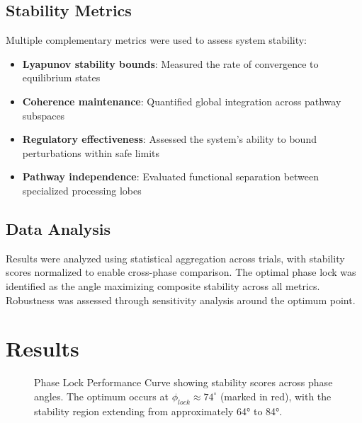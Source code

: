 \documentclass[12pt,a4paper]{report}
\begin{document}
\subsection{Stability Metrics}

Multiple complementary metrics were used to assess system stability:

\begin{itemize}
\item \textbf{Lyapunov stability bounds}: Measured the rate of convergence to equilibrium states
\item \textbf{Coherence maintenance}: Quantified global integration across pathway subspaces  
\item \textbf{Regulatory effectiveness}: Assessed the system's ability to bound perturbations within safe limits
\item \textbf{Pathway independence}: Evaluated functional separation between specialized processing lobes
\end{itemize}

\subsection{Data Analysis}

Results were analyzed using statistical aggregation across trials, with stability scores normalized to enable cross-phase comparison. The optimal phase lock was identified as the angle maximizing composite stability across all metrics. Robustness was assessed through sensitivity analysis around the optimum point.

\section{Results}

\begin{figure}[H]
\centering
{}
\caption{Phase Lock Performance Curve showing stability scores across phase angles. The optimum occurs at $\phi_{lock} \approx 74^\circ$ (marked in red), with the stability region extending from approximately 64° to 84°.}
\label{fig:phase_lock_curve}
\end{figure}
\end{document}
